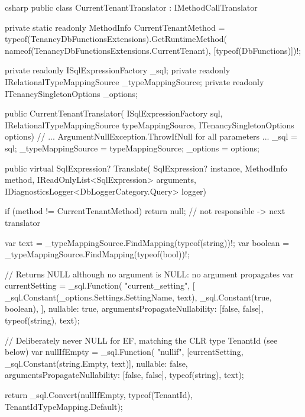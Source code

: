 \begin{sourcecode}{csharp}
public class CurrentTenantTranslator : IMethodCallTranslator
{
    private static readonly MethodInfo CurrentTenantMethod =
        typeof(TenancyDbFunctionsExtensions).GetRuntimeMethod(
            nameof(TenancyDbFunctionsExtensions.CurrentTenant), [typeof(DbFunctions)])!;

    private readonly ISqlExpressionFactory _sql;
    private readonly IRelationalTypeMappingSource _typeMappingSource;
    private readonly ITenancySingletonOptions _options;

    public CurrentTenantTranslator(
        ISqlExpressionFactory sql,
        IRelationalTypeMappingSource typeMappingSource,
        ITenancySingletonOptions options)
    {
        // ... ArgumentNullException.ThrowIfNull for all parameters ...
        _sql = sql;
        _typeMappingSource = typeMappingSource;
        _options = options;
    }

    public virtual SqlExpression? Translate(
        SqlExpression? instance, MethodInfo method,
        IReadOnlyList<SqlExpression> arguments,
        IDiagnosticsLogger<DbLoggerCategory.Query> logger)
    {
        if (method != CurrentTenantMethod)
            return null;                          // not responsible -> next translator

        var text = _typeMappingSource.FindMapping(typeof(string))!;
        var boolean = _typeMappingSource.FindMapping(typeof(bool))!;

        // Returns NULL although no argument is NULL: no argument propagates
        var currentSetting = _sql.Function(
            "current_setting",
            [
                _sql.Constant(_options.Settings.SettingName, text),
                _sql.Constant(true, boolean),
            ],
            nullable: true,
            argumentsPropagateNullability: [false, false],
            typeof(string), text);

        // Deliberately never NULL for EF, matching the CLR type TenantId (see below)
        var nullIfEmpty = _sql.Function(
            "nullif",
            [currentSetting, _sql.Constant(string.Empty, text)],
            nullable: false,
            argumentsPropagateNullability: [false, false],
            typeof(string), text);

        return _sql.Convert(nullIfEmpty, typeof(TenantId), TenantIdTypeMapping.Default);
    }
}
\end{sourcecode}

